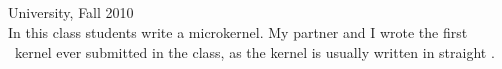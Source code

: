\begin{resume}
% 
% 
 


\section{}
University, Fall 2010\\
In this class students write a microkernel. My partner and I wrote the first
\kw{\Cplusplus}\ kernel ever submitted in the class, as the kernel is
usually written in straight .


\end{resume}
